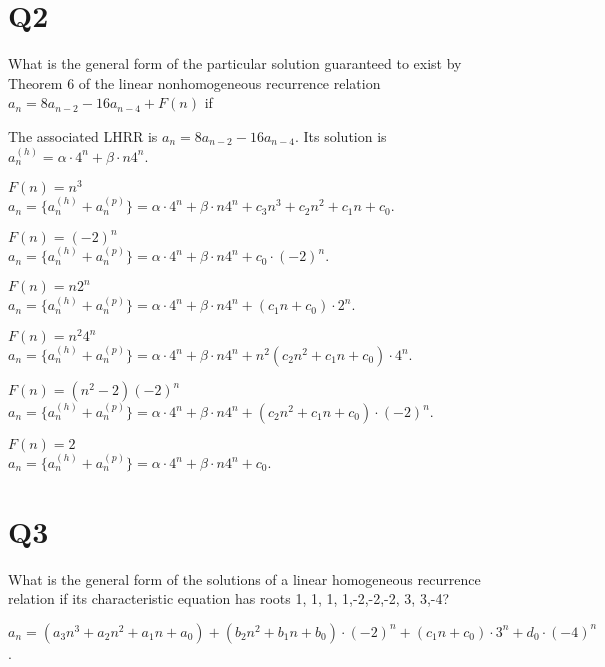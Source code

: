 \documentclass[11pt]{article}
\begin{document}
\section*{Q2}
What is the general form of the particular solution guaranteed
to exist by Theorem 6 of the linear nonhomogeneous
recurrence relation $a_{n}=8a_{n-2}-16a_{n-4}+F(n)$ if
\begin{solution}
    The associated LHRR is $a_{n}=8a_{n-2}-16a_{n-4}$. Its solution 
    is $a_{n}^{(h)}=\alpha\cdot 4^{n}+\beta\cdot n 4^{n}$.
    \begin{qparts}
        
        \item $F(n)=n^{3}$\\
        $a_{n}=\{ a_{n}^{(h)}+a_{n}^{(p)} \}=
        \alpha\cdot 4^{n}+\beta\cdot n 4^{n}+
        c_3 n^{3}+c_2 n^{2}+c_1 n+c_0$.

        \item $F(n)=(-2)^{n}$\\
        $a_{n}=\{ a_{n}^{(h)}+a_{n}^{(p)} \}=
        \alpha\cdot 4^{n}+\beta\cdot n 4^{n}+
        c_0\cdot (-2)^{n}
        $.

        \item $F(n)=n  2^{n}$\\
        $a_{n}=\{ a_{n}^{(h)}+a_{n}^{(p)} \}=
        \alpha\cdot 4^{n}+\beta\cdot n 4^{n}+
        (c_1 n+c_0)\cdot 2^{n}
        $.

        \item $F(n)=n^{2}4^{n}$\\
        $a_{n}=\{ a_{n}^{(h)}+a_{n}^{(p)} \}=
        \alpha\cdot 4^{n}+\beta\cdot n 4^{n}+
        n^{2}(c_2 n^{2}+c_1 n+c_0)\cdot 4^{n}
        $.

        \item $F(n)=(n^{2}-2)(-2)^{n}$\\
        $a_{n}=\{ a_{n}^{(h)}+a_{n}^{(p)} \}=
        \alpha\cdot 4^{n}+\beta\cdot n 4^{n}+
        (c_2 n^{2}+c_1 n+c_0)\cdot (-2)^{n}
        $.

        \item $F(n)=2$\\
        $a_{n}=\{ a_{n}^{(h)}+a_{n}^{(p)} \}=
        \alpha\cdot 4^{n}+\beta\cdot n 4^{n}+c_0
        $.
    \end{qparts}
\end{solution}

\section*{Q3}
What is the general form of the solutions of a linear
homogeneous recurrence relation if its characteristic equation
has roots 1, 1, 1, 1,-2,-2,-2, 3, 3,-4?
\begin{solution}
    $a_{n}=(a_3 n^{3}+a_2 n^{2}+a_1 n+a_0)+
    (b_2 n^{2}+b_1 n+b_0)\cdot (-2)^{n}+
    (c_1 n+c_0)\cdot 3^{n}+
    d_0\cdot (-4)^{n}
    $.
\end{solution}
\end{document}
